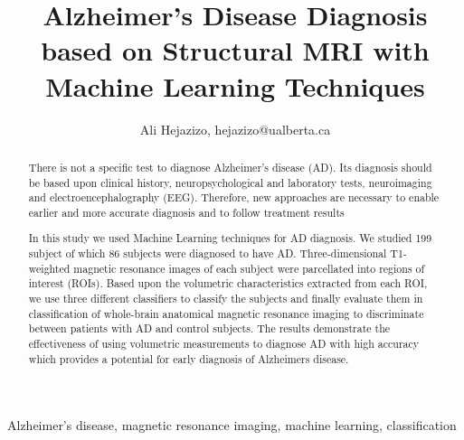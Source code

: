 \documentclass[journal]{IEEEtran}
\begin{document}
\title{Alzheimer's Disease Diagnosis based on Structural MRI with Machine Learning Techniques}
\author{Ali Hejazizo, hejazizo@ualberta.ca}


\maketitle


\begin{abstract}
There is not a specific test to diagnose Alzheimer's disease (AD). Its diagnosis should be based upon clinical history, neuropsychological and laboratory tests, neuroimaging and electroencephalography (EEG). Therefore, new approaches are necessary to enable earlier and more accurate diagnosis and to follow treatment results

In this study we used Machine Learning techniques for AD diagnosis. We studied 199 subject of which 86 subjects were diagnosed to have AD. Three-dimensional T1-weighted magnetic resonance images of each subject were parcellated into regions of interest (ROIs). Based upon the volumetric characteristics extracted from each ROI, we use three different classifiers to classify the subjects and finally evaluate them in classification of whole-brain anatomical magnetic resonance imaging to discriminate between patients with AD and control subjects. The results demonstrate the effectiveness of using volumetric measurements to diagnose AD with high accuracy which provides a potential for early diagnosis of Alzheimers disease.

\end{abstract}

\begin{IEEEkeywords}
Alzheimer's disease, magnetic resonance imaging, machine learning, classification
\end{IEEEkeywords}
















\end{document}
